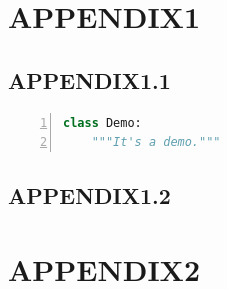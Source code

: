 
\chapter{APPENDIX1}

\section{APPENDIX1.1}


\begin{lstlisting}[language=Python, caption={代码}, label={code:demo}, frame=single, numbers=left, basicstyle=\ttfamily\small]
class Demo:
    """It's a demo."""
\end{lstlisting}

\section{APPENDIX1.2}

\chapter{APPENDIX2}
